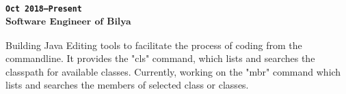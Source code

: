 \subsubsection{\textsubscript{\uppercase{\texttt{Oct 2018--Present}}\\
Software Engineer of Bilya
}
}
Building Java Editing tools to facilitate the process of coding from the commandline.
It provides the "cls" command, which lists and searches the classpath for available classes.
Currently, working on the "mbr" command which lists and searches the members of selected class or classes.
